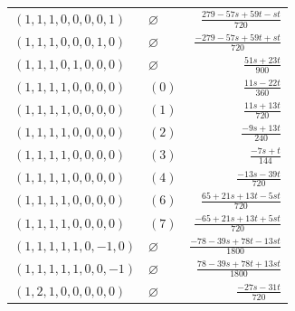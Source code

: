 \begin{longtable}{@{}llr@{}}
$(1,1,1,0,0,0,0,1)$ & $\varnothing$ & $\frac{279-57s+59t-st}{720}$\\
$(1,1,1,0,0,0,1,0)$ & $\varnothing$ & $\frac{-279-57s+59t+st}{720}$\\
$(1,1,1,0,1,0,0,0)$ & $\varnothing$ & $\frac{51s+23t}{900}$\\
$(1,1,1,1,0,0,0,0)$ & $(0)$ & $\frac{11s-22t}{360}$\\
$(1,1,1,1,0,0,0,0)$ & $(1)$ & $\frac{11s+13t}{720}$\\
$(1,1,1,1,0,0,0,0)$ & $(2)$ & $\frac{-9s+13t}{240}$\\
$(1,1,1,1,0,0,0,0)$ & $(3)$ & $\frac{-7s+t}{144}$\\
$(1,1,1,1,0,0,0,0)$ & $(4)$ & $\frac{-13s-39t}{720}$\\
$(1,1,1,1,0,0,0,0)$ & $(6)$ & $\frac{65+21s+13t-5st}{720}$\\
$(1,1,1,1,0,0,0,0)$ & $(7)$ & $\frac{-65+21s+13t+5st}{720}$\\
$(1,1,1,1,1,0,-1,0)$ & $\varnothing$ & $\frac{-78-39s+78t-13st}{1800}$\\
$(1,1,1,1,1,0,0,-1)$ & $\varnothing$ & $\frac{78-39s+78t+13st}{1800}$\\
$(1,2,1,0,0,0,0,0)$ & $\varnothing$ & $\frac{-27s-31t}{720}$\\
\end{longtable}
\endgroup
